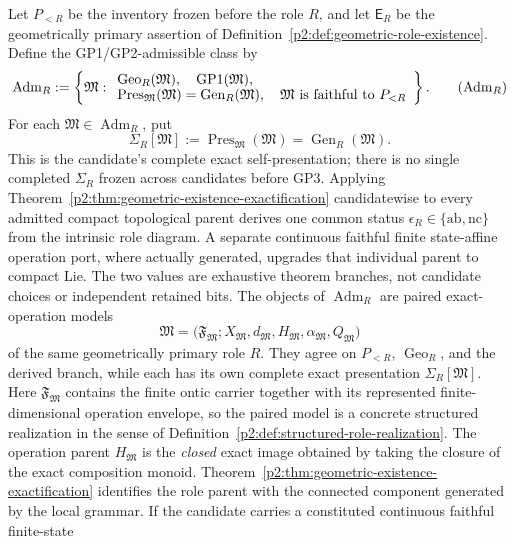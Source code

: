 \documentclass[12pt,a4paper]{article}
\begin{document}
\begin{definition}
\label{p2:def:cumulative-role-allocation}
Let \(P_{<R}\) be the inventory frozen before the role \(R\), and let
\(\mathsf E_R\) be the geometrically primary assertion of
Definition~\ref{p2:def:geometric-role-existence}.  Define the GP1/GP2-admissible
class by
\[
 \operatorname{Adm}_R
 :=\left\{\mathfrak M:
 \begin{array}{l}
 \operatorname{Geo}_R(\mathfrak M),\quad
 \mathrm{GP1}(\mathfrak M),\\[-1pt]
 \operatorname{Pres}_{\mathfrak M}(\mathfrak M)
 =\operatorname{Gen}_R(\mathfrak M),\quad
 \mathfrak M\text{ is faithful to }P_{<R}
 \end{array}\right\}.
 \tag{\ensuremath{\mathrm{Adm}_R}}
\]
For each \(\mathfrak M\in\operatorname{Adm}_R\), put
\[
 \Sigma_R[\mathfrak M]
 :=\operatorname{Pres}_{\mathfrak M}(\mathfrak M)
 =\operatorname{Gen}_R(\mathfrak M).
\]
This is the candidate's complete exact self-presentation; there is no single
completed \(\Sigma_R\) frozen across candidates before GP3.  Applying
Theorem~\ref{p2:thm:geometric-existence-exactification} candidatewise
to every admitted compact topological parent derives one common status
\(\epsilon_R\in\{\mathrm{ab},\mathrm{nc}\}\) from the intrinsic role
diagram.  A separate continuous faithful finite state-affine operation port,
where actually generated, upgrades that individual parent to compact Lie.  The two values are exhaustive theorem branches, not
candidate choices or independent retained bits.  The objects of
\(\operatorname{Adm}_R\) are paired exact-operation models
\[
 \mathfrak M=
 \bigl(\mathfrak F_{\mathfrak M};
       X_{\mathfrak M},d_{\mathfrak M},H_{\mathfrak M},
       \alpha_{\mathfrak M},Q_{\mathfrak M}\bigr)
\]
of the same geometrically primary role \(R\).  They agree on
\(P_{<R}\), \(\operatorname{Geo}_R\), and the derived branch, while each has
its own complete exact presentation \(\Sigma_R[\mathfrak M]\).  Here
\(\mathfrak F_{\mathfrak M}\) contains the finite ontic carrier together with
its represented finite-dimensional operation envelope, so the paired model is
a concrete structured realization in the sense of
Definition~\ref{p2:def:structured-role-realization}.  The operation parent
\(H_{\mathfrak M}\) is the \emph{closed} exact image obtained by taking the
closure of the exact composition monoid.
Theorem~\ref{p2:thm:geometric-existence-exactification} identifies the role
parent with the connected component generated by the local grammar.
If the candidate carries a constituted continuous faithful finite-state

\end{definition}
\end{document}
